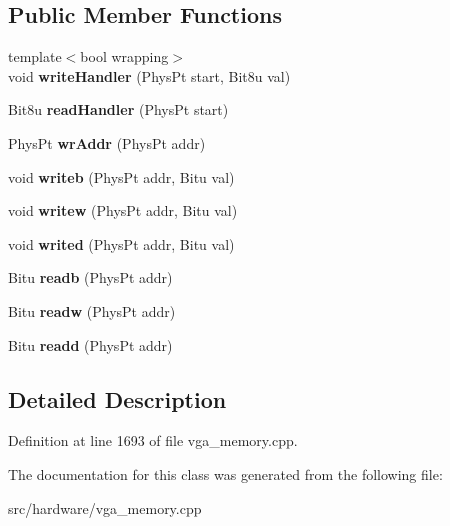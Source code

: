 \subsection*{Public Member Functions}
\begin{DoxyCompactItemize}
\item 
\hypertarget{classVGA__AMS__Handler_aeb0a1c400b9162e4e5e48bf0905d4865}{{\footnotesize template$<$bool wrapping$>$ }\\void {\bfseries write\-Handler} (Phys\-Pt start, Bit8u val)}\label{classVGA__AMS__Handler_aeb0a1c400b9162e4e5e48bf0905d4865}

\item 
\hypertarget{classVGA__AMS__Handler_a5661278164e2d7259ee9c8fe4c35d6df}{Bit8u {\bfseries read\-Handler} (Phys\-Pt start)}\label{classVGA__AMS__Handler_a5661278164e2d7259ee9c8fe4c35d6df}

\item 
\hypertarget{classVGA__AMS__Handler_a63b72ffd104220eb928c683bae72def3}{Phys\-Pt {\bfseries wr\-Addr} (Phys\-Pt addr)}\label{classVGA__AMS__Handler_a63b72ffd104220eb928c683bae72def3}

\item 
\hypertarget{classVGA__AMS__Handler_a59765d00055305e3d5d9cae3eda1a135}{void {\bfseries writeb} (Phys\-Pt addr, Bitu val)}\label{classVGA__AMS__Handler_a59765d00055305e3d5d9cae3eda1a135}

\item 
\hypertarget{classVGA__AMS__Handler_a2ca35cd2132c57ab9a6cd145ca686efd}{void {\bfseries writew} (Phys\-Pt addr, Bitu val)}\label{classVGA__AMS__Handler_a2ca35cd2132c57ab9a6cd145ca686efd}

\item 
\hypertarget{classVGA__AMS__Handler_a3a628a09de5d72345c7b602f162de07b}{void {\bfseries writed} (Phys\-Pt addr, Bitu val)}\label{classVGA__AMS__Handler_a3a628a09de5d72345c7b602f162de07b}

\item 
\hypertarget{classVGA__AMS__Handler_aa0a91b3133a6f53ab71af097705e5576}{Bitu {\bfseries readb} (Phys\-Pt addr)}\label{classVGA__AMS__Handler_aa0a91b3133a6f53ab71af097705e5576}

\item 
\hypertarget{classVGA__AMS__Handler_a91ae2471698b76066cff1f58dac6708c}{Bitu {\bfseries readw} (Phys\-Pt addr)}\label{classVGA__AMS__Handler_a91ae2471698b76066cff1f58dac6708c}

\item 
\hypertarget{classVGA__AMS__Handler_a98c3e7090b6a26e69c4afc84dc092415}{Bitu {\bfseries readd} (Phys\-Pt addr)}\label{classVGA__AMS__Handler_a98c3e7090b6a26e69c4afc84dc092415}

\end{DoxyCompactItemize}


\subsection{Detailed Description}


Definition at line 1693 of file vga\-\_\-memory.\-cpp.



The documentation for this class was generated from the following file\-:\begin{DoxyCompactItemize}
\item 
src/hardware/vga\-\_\-memory.\-cpp\end{DoxyCompactItemize}
